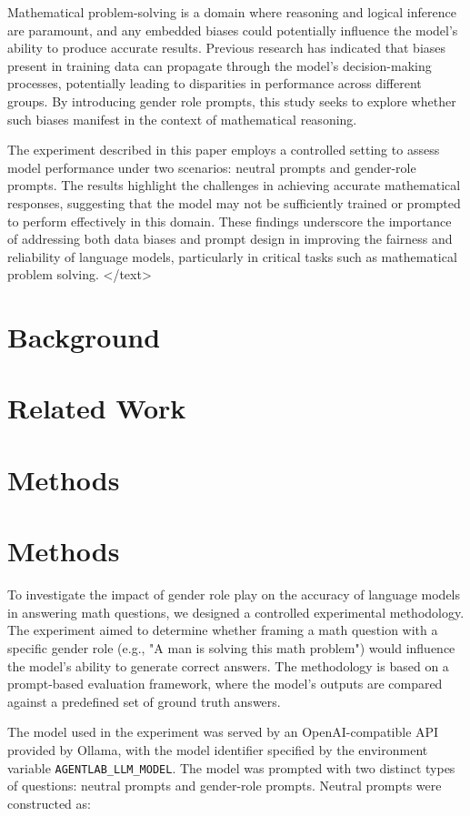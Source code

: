 \documentclass{article}
\begin{document}
Mathematical problem-solving is a domain where reasoning and logical inference are paramount, and any embedded biases could potentially influence the model's ability to produce accurate results. Previous research has indicated that biases present in training data can propagate through the model's decision-making processes, potentially leading to disparities in performance across different groups. By introducing gender role prompts, this study seeks to explore whether such biases manifest in the context of mathematical reasoning. 

The experiment described in this paper employs a controlled setting to assess model performance under two scenarios: neutral prompts and gender-role prompts. The results highlight the challenges in achieving accurate mathematical responses, suggesting that the model may not be sufficiently trained or prompted to perform effectively in this domain. These findings underscore the importance of addressing both data biases and prompt design in improving the fairness and reliability of language models, particularly in critical tasks such as mathematical problem solving.
</text>
\section{Background}

\section{Related Work}

\section{Methods}
\section{Methods}

To investigate the impact of gender role play on the accuracy of language models in answering math questions, we designed a controlled experimental methodology. The experiment aimed to determine whether framing a math question with a specific gender role (e.g., "A man is solving this math problem") would influence the model's ability to generate correct answers. The methodology is based on a prompt-based evaluation framework, where the model's outputs are compared against a predefined set of ground truth answers.

The model used in the experiment was served by an OpenAI-compatible API provided by Ollama, with the model identifier specified by the environment variable \texttt{AGENTLAB\_LLM\_MODEL}. The model was prompted with two distinct types of questions: neutral prompts and gender-role prompts. Neutral prompts were constructed as: 
\end{document}
